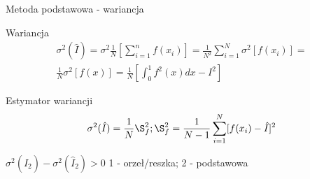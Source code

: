 \begin{frame}{Metoda podstawowa - wariancja}
	\vspace{-.5cm}
	\begin{block}{Wariancja}
		\begin{align*}
			\sigma^2(\hat{I}) = 
            \sigma^2 \frac{1}{N} \left[ 
            	\sum_{i=1}^n f(x_i)
            	\right] =
            \frac{1}{N^2} \sum_{i=1}^N \sigma^2 [f(x_i)] =
            \\
            \frac{1}{N} \sigma^2 [f(x)] = 
            \frac{1}{N} \left[ 
            	\int_0^1 f^2(x)dx - I^2
            	\right]
		\end{align*}
	\end{block}
    
    \begin{block}{Estymator wariancji}
    	\[
        	\sigma^2(\hat{I}) = \frac{1}{N} \S_f^2; 
            \S_f^2 = \frac{1}{N-1} \sum_{i=1}^N [f(x_i) - \hat{I}]^2
        \]
    \end{block}
    
    $\sigma^2(\hat{I}_2) - \sigma^2(\hat{I}_2) > 0$ \hspace{.5cm}
    1 - orzeł/reszka; \hspace{.5cm}
    2 - podstawowa
\end{frame}